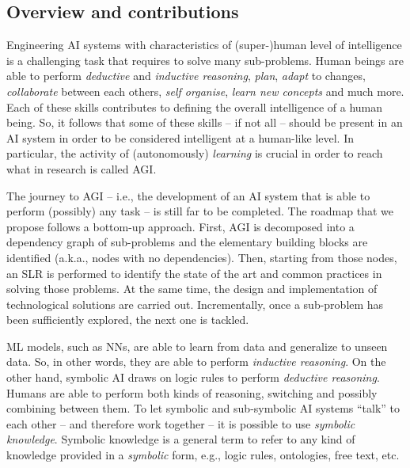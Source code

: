 \begin{refsection}
\section{Overview and contributions}
\label{sec:overview-and-contributions}
%
Engineering \gls{AI} systems with characteristics of (super-)human level of intelligence is a challenging task that requires to solve many sub-problems.
%
Human beings are able to perform \emph{deductive} and \emph{inductive reasoning}, \emph{plan}, \emph{adapt} to changes, \emph{collaborate} between each others, \emph{self organise}, \emph{learn new concepts} and much more.
%
Each of these skills contributes to defining the overall intelligence of a human being.
%
So, it follows that some of these skills -- if not all -- should be present in an \gls{AI} system in order to be considered intelligent at a human-like level.
%
In particular, the activity of (autonomously) \emph{learning} is crucial in order to reach what in research is called \gls{AGI}.


The journey to \gls{AGI} -- i.e., the development of an \gls{AI} system that is able to perform (possibly) any task -- is still far to be completed.
%
The roadmap that we propose follows a bottom-up approach.
%
%
First, \gls{AGI} is decomposed into a dependency graph of sub-problems and the elementary building blocks are identified (a.k.a., nodes with no dependencies).
%
Then, starting from those nodes, an \gls{SLR} is performed to identify the state of the art and common practices in solving those problems.
%
At the same time, the design and implementation of technological solutions are carried out.
%
Incrementally, once a sub-problem has been sufficiently explored, the next one is tackled.


\Gls{ML} models, such as \acp{NN}, are able to learn from data and generalize to unseen data.
%
So, in other words, they are able to perform \emph{inductive reasoning}.
%
On the other hand, symbolic \gls{AI} draws on logic rules to perform \emph{deductive reasoning}.
%
Humans are able to perform both kinds of reasoning, switching and possibly combining between them.
%
To let symbolic and sub-symbolic \gls{AI} systems ``talk'' to each other -- and therefore work together -- it is possible to use \emph{symbolic knowledge}.
%
Symbolic knowledge is a general term to refer to any kind of knowledge provided in a \emph{symbolic} form, e.g., logic rules, ontologies, free text, etc.



\end{refsection}

